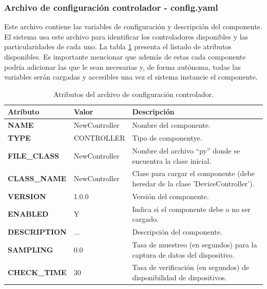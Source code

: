         \subsubsection{Archivo de configuración controlador - config.yaml}
        \label{sub2:ConfigFileController}
            Este archivo contiene las variables de configuración y descripción del componente. El sistema usa este archivo para identificar los controladores disponibles y las particularidades de cada uno. La tabla \ref{Tab:ConfigFileController} presenta el listado de atributos disponibles. Es importante mencionar que además de estas cada componente podría adicionar las que le sean necesarias y, de forma autónoma, todas las variables serán cargadas y accesibles una vez el sistema instancie el componente.

            \begin{table}[ht!]
            \caption[Archivo de configuración controlador]{Atributos del archivo de configuración controlador.}
            \label{Tab:ConfigFileController}
            \centering
            \begin{tabular}{ | l l p{6cm} | } 
                \hline
                \textbf{Atributo}       & \textbf{Valor} & \textbf{Descripción} \\ 
                \hline\hline
                \textbf{NAME}           & NewController & Nombre del componente.\\
                \hline
                \textbf{TYPE}           & CONTROLLER    & Tipo de componentye.\\
                \hline
                \textbf{FILE\_CLASS}    & NewController & Nombre del archivo ``py'' donde se encuentra la clase inicial.\\
                \hline
                \textbf{CLASS\_NAME}    & NewController & Clase para cargar el componente (debe heredar de la clase 'DeviceController').\\
                \hline
                \textbf{VERSION}        & 1.0.0         &  Versión del componente.\\
                \hline
                \textbf{ENABLED}        & Y             & Indica si el componente debe o no ser cargado.\\
                \hline
                \textbf{DESCRIPTION}    & ...           & Descripción del componente.\\
                \hline
                \textbf{SAMPLING}       & 0.0           & Tasa de muestreo (en segundos) para la captura de datos del dispositivo.\\
                \hline
                \textbf{CHECK\_TIME}     & 30           &  Tasa de verificación (en segundos) de disponibilidad de dispositivos.\\
                \hline
            \end{tabular}
            \end{table}
            
